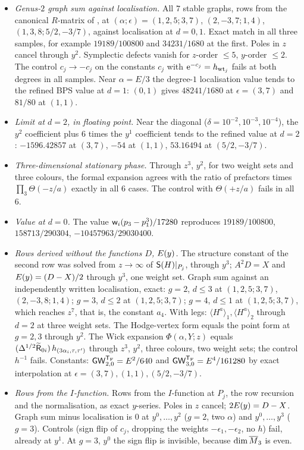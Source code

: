 \begin{itemize}
\item \emph{Genus-$2$ graph sum against localisation.} All $7$ stable graphs, rows from the canonical $R$-matrix of \cite{BS}, at $(\alpha;\epsilon)=(1,2,5;3,7)$, $(2,-3,7;1,4)$, $(1,3,8;5/2,-3/7)$, against localisation at $d=0,1$. Exact match in all three samples, for example $19189/100800$ and $34231/1680$ at the first. Poles in $z$ cancel through $y^2$. Symplectic defects vanish for $z$-order $\leq 5$, $y$-order $\leq 2$. The control $c_j\to-c_j$ on the constants $c_j$ with $\mathrm{e}^{-c_j}=h_{\mathrm{wt}_j}$ fails at both degrees in all samples. Near $\alpha=E/3$ the degree-$1$ localisation value tends to the refined BPS value at $d=1$: $(0,1)$ gives $48241/1680$ at $\epsilon=(3,7)$ and $81/80$ at $(1,1)$.
\item \emph{Limit at $d=2$, in floating point.} Near the diagonal ($\delta=10^{-2},10^{-3},10^{-4}$), the $y^2$ coefficient plus $6$ times the $y^1$ coefficient tends to the refined value at $d=2$: $-1596.42857$ at $(3,7)$, $-54$ at $(1,1)$, $53.16494$ at $(5/2,-3/7)$.
\item \emph{Three-dimensional stationary phase.} Through $z^3$, $y^2$, for two weight sets and three colours, the formal expansion agrees with the ratio of prefactors times $\prod_3\Theta(-z/a)$ exactly in all $6$ cases. The control with $\Theta(+z/a)$ fails in all $6$.
\item \emph{Value at $d=0$.} The value $\mathsf{w}_i(p_3-p_1^3)/17280$ reproduces $19189/100800$, $158713/290304$, $-10457963/29030400$.
\item \emph{Rows derived without the functions $D$, $E(y)$.} The structure constant of the second row was solved from $z\to\infty$ of $\mathsf{S}(H)|_{P_j}$, through $y^3$; $A^2D=X$ and $E(y)=(D-X)/2$ through $y^3$, one weight set. Graph sum against an independently written localisation, exact: $g=2$, $d\leq 3$ at $(1,2,5;3,7)$, $(2,-3,8;1,4)$; $g=3$, $d\leq 2$ at $(1,2,5;3,7)$; $g=4$, $d\leq 1$ at $(1,2,5;3,7)$, which reaches $z^7$, that is, the constant $a_4$. With legs: $\langle H^a\rangle_1,\langle H^a\rangle_2$ through $d=2$ at three weight sets. The Hodge-vertex form equals the point form at $g=2,3$ through $y^2$. The Wick expansion $\Phi(\alpha,Y;z)$ equals $(\Delta^{1/2}\widetilde{\mathsf{R}}_{0i})\,h_{(3\alpha_i,\tau,\tau')}$ through $z^3$, $y^2$, three colours, two weight sets; the control $h^{-1}$ fails. Constants: $\mathsf{GW}_{2,0}^{\mathsf{T}_{\mathrm{F}}}=E^2/640$ and $\mathsf{GW}_{3,0}^{\mathsf{T}_{\mathrm{F}}}=E^4/161280$ by exact interpolation at $\epsilon=(3,7),(1,1),(5/2,-3/7)$.
\item \emph{Rows from the $I$-function.} Rows from the $I$-function at $P_j$, the row recursion and the normalisation, as exact $y$-series. Poles in $z$ cancel; $2E(y)=D-X$. Graph sum minus localisation is $0$ at $y^0,\dots,y^2$ ($g=2$, two $\alpha$) and $y^0,\dots,y^3$ ($g=3$). Controls (sign flip of $c_j$, dropping the weights $-\epsilon_1,-\epsilon_2$, no $h$) fail, already at $y^1$. At $g=3$, $y^0$ the sign flip is invisible, because $\dim\overline{M}_3$ is even.

\end{itemize}
